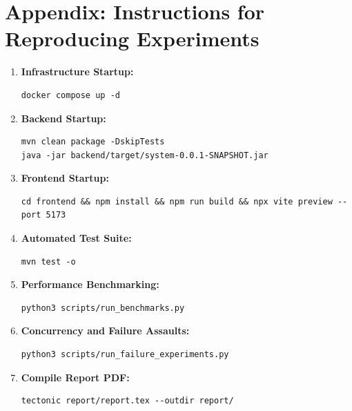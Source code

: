 \documentclass[11pt,a4paper]{article}
\begin{document}
\section{Appendix: Instructions for Reproducing Experiments}
\begin{enumerate}
    \item \textbf{Infrastructure Startup:}
    \begin{verbatim}
docker compose up -d
    \end{verbatim}
    \item \textbf{Backend Startup:}
    \begin{verbatim}
mvn clean package -DskipTests
java -jar backend/target/system-0.0.1-SNAPSHOT.jar
    \end{verbatim}
    \item \textbf{Frontend Startup:}
    \begin{lstlisting}[breaklines=true,numbers=none]
cd frontend && npm install && npm run build && npx vite preview --port 5173
    \end{lstlisting}
    \item \textbf{Automated Test Suite:}
    \begin{verbatim}
mvn test -o
    \end{verbatim}
    \item \textbf{Performance Benchmarking:}
    \begin{verbatim}
python3 scripts/run_benchmarks.py
    \end{verbatim}
    \item \textbf{Concurrency and Failure Assaults:}
    \begin{verbatim}
python3 scripts/run_failure_experiments.py
    \end{verbatim}
    \item \textbf{Compile Report PDF:}
    \begin{verbatim}
tectonic report/report.tex --outdir report/
    \end{verbatim}
\end{enumerate}
\end{document}
